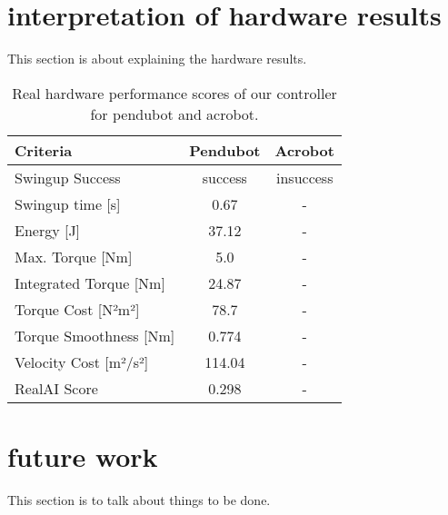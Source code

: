 \section{interpretation of hardware results}
This section is about explaining the hardware results.

\begin{table}
  \centering
 \begin{tabular}{lcc}
  Criteria& Pendubot  & Acrobot \\
 \hline
 Swingup Success& success  & insuccess\\
 Swingup time [s]& 0.67   & -\\
 Energy [J]& 37.12  & - \\
 Max. Torque [Nm]& 5.0   & - \\
 Integrated Torque [Nm]& 24.87  & - \\
 Torque Cost [N²m²] & 78.7  & - \\
 Torque Smoothness [Nm]& 0.774 & - \\
 Velocity Cost [m²/s²]& 114.04 & -  \\
 RealAI Score & 0.298 & -  \\
 \end{tabular}
 \caption{Real hardware performance scores of our controller for pendubot and acrobot.}
 \label{tab:performance}
\end{table}

\section{future work}
This section is to talk about things to be done.

\cleardoublepage
